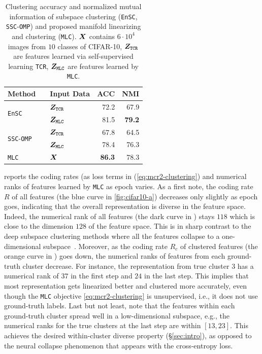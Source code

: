\documentclass[10pt,twocolumn,letterpaper]{article}
\newcommand{\ours}{MLC}
\newcommand{\mours}{\texttt{\ours}}
\begin{document}
   
   
   \begin{table}[t]
       \centering
       \small
       \setlength{\tabcolsep}{15.5pt}
       \caption{Clustering accuracy and normalized mutual information of subspace clustering (\texttt{EnSC}, \texttt{SSC}-\texttt{OMP}) and proposed manifold linearizing and clustering (\mours{}). ${\bm{X}}$ contains $6\cdot 10^{4}$ images from $10$ classes of CIFAR-10, ${\bm{Z}}_{\text{\texttt{TCR}}}$ are features learned via self-supervised learning \texttt{TCR}, $\mZ_{\text{\mours}}$ are features learned by \mours.} 
       \label{tab:sc}
       \begin{tabular}{@{}lllrr@{}}
       \toprule
       Method &  & Input Data & ACC & NMI \\ \midrule
       \multirow{2}{*}{\texttt{EnSC}} &  & ${\bm{Z}}_{\text{\texttt{TCR}}}$ & 72.2 & 67.9 \\
        &  & $\mZ_{\text{\mours}}$ & 81.5 & \textbf{79.2} \\ \midrule
       \multirow{2}{*}{\texttt{SSC}-\texttt{OMP}} &  & ${\bm{Z}}_{\text{\texttt{TCR}}}$ & 67.8 & 64.5 \\
        &  & $\mZ_{\text{\mours}}$  & 78.4 & 76.3 \\ \midrule
       \mours &  & ${\bm{X}}$ & \textbf{86.3} & 78.3 \\ \bottomrule
       \end{tabular}
   \end{table}
   
   
   
     reports the coding rates (as loss terms in (\ref{eq:mcr2-clustering}) and numerical ranks of features learned by \mours{} as epoch varies. As a first note, the coding rate $R$ of all features (the blue curve in \ref{fig:cifar10-a}) decreases only slightly as epoch goes, indicating that the overall representation is diverse in the feature space. Indeed, the numerical rank of all features (the dark curve in ) stays $118$ which is close to the dimension $128$ of the feature space. This is in sharp contrast to the deep subspace clustering methods where all the features collapse to a one-dimensional subspace~\cite{Haeffele2020-kj}. Moreover, as the coding rate $R_c$ of clustered features (the orange curve in ) goes down, the numerical ranks of features from each ground-truth cluster decrease. For instance, the representation from true cluster $3$ has a numerical rank of $37$ in the first step and $24$ in the last step. This implies that most representation gets linearized better and clustered more accurately, even though the \mours{} objective \eqref{eq:mcr2-clustering} is unsupervised, i.e., it does not use ground-truth labels. Last but not least, note that the features within each ground-truth cluster spread well in a low-dimensional subspace, e.g., the numerical ranks for the true clusters at the last step are within $[13, 23]$. This achieves the desired within-cluster diverse property (\S \ref{sec:intro}), as opposed to the neural collapse phenomenon that appears with the cross-entropy loss.  
   
\end{document}
